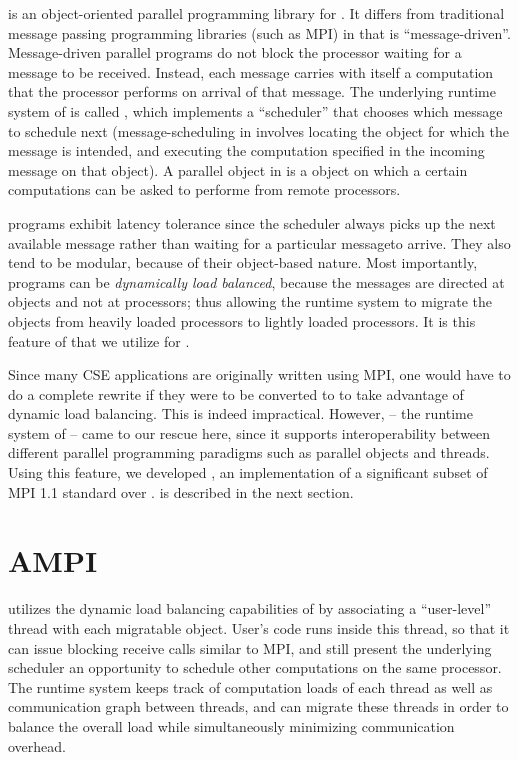 \documentclass[10pt]{article}
\begin{document}
\charmpp{} is an object-oriented parallel programming library for \CC{}.  It
differs from traditional message passing programming libraries (such as MPI) in
that \charmpp{} is ``message-driven''. Message-driven parallel programs do not
block the processor waiting for a message to be received.  Instead, each
message carries with itself a computation that the processor performs on
arrival of that message. The underlying runtime system of \charmpp{} is called
\converse{}, which implements a ``scheduler'' that chooses which message to
schedule next (message-scheduling in \charmpp{} involves locating the object
for which the message is intended, and executing the computation specified in
the incoming message on that object). A parallel object in \charmpp{} is a
\CC{} object on which a certain computations can be asked to performe from
remote processors.

\charmpp{} programs exhibit latency tolerance since the scheduler always picks
up the next available message rather than waiting for a particular messageto
arrive.  They also tend to be modular, because of their object-based nature.
Most importantly, \charmpp{} programs can be \emph{dynamically load balanced},
because the messages are directed at objects and not at processors; thus
allowing the runtime system to migrate the objects from heavily loaded
processors to lightly loaded processors. It is this feature of \charmpp{} that
we utilize for \ampi{}.

Since many CSE applications are originally written using MPI, one would have to
do a complete rewrite if they were to be converted to \charmpp{} to take
advantage of dynamic load balancing. This is indeed impractical. However,
\converse{} -- the runtime system of \charmpp{} -- came to our rescue here,
since it supports interoperability between different parallel programming
paradigms such as parallel objects and threads. Using this feature, we
developed \ampi{}, an implementation of a significant subset of MPI 1.1
standard over \charmpp{}.  \ampi{} is described in the next section.

\section{AMPI}

\ampi{} utilizes the dynamic load balancing capabilities of \charmpp{} by
associating a ``user-level'' thread with each \charmpp{} migratable object.
User's code runs inside this thread, so that it can issue blocking receive
calls similar to MPI, and still present the underlying scheduler an opportunity
to schedule other computations on the same processor. The runtime system keeps
track of computation loads of each thread as well as communication graph
between \ampi{} threads, and can migrate these threads in order to balance the
overall load while simultaneously minimizing communication overhead. 
\end{document}
